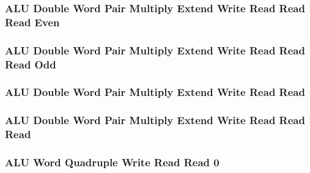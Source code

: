 

\subsubsection[{\small ALU Double Word Pair Multiply Extend Write Read Read Read Even}]{ALU Double Word Pair Multiply Extend Write Read Read Read Even} \label{sec:format-ALU-DPMEWRRRE}



\subsubsection[{\small ALU Double Word Pair Multiply Extend Write Read Read Read Odd}]{ALU Double Word Pair Multiply Extend Write Read Read Read Odd} \label{sec:format-ALU-DPMEWRRRO}



\subsubsection[{\small ALU Double Word Pair Multiply Extend Write Read Read}]{ALU Double Word Pair Multiply Extend Write Read Read} \label{sec:format-ALU-DPMXWRR}



\subsubsection[{\small ALU Double Word Pair Multiply Extend Write Read Read Read}]{ALU Double Word Pair Multiply Extend Write Read Read Read} \label{sec:format-ALU-DPMXWRRR}



\subsubsection[{\small ALU Word Quadruple Write Read Read 0}]{ALU Word Quadruple Write Read Read 0} \label{sec:format-ALU-WQWRR0}

